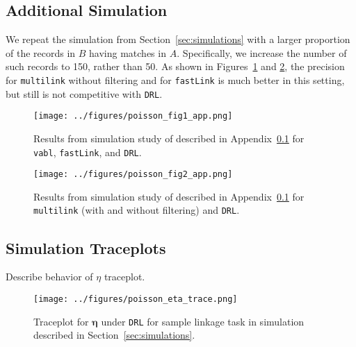 \documentclass[12pt,letterpaper]{article}
\newcommand{\1}[1]{\mathbb{I}\!\left[#1\right]} %
\begin{document}
\subsection{Additional Simulation}\label{app:simulation-2}

We repeat the simulation from Section~\ref{sec:simulations} with a larger proportion of the records in $B$ having matches in $A$. Specifically, we increase the number of such records to 150, rather than 50. As shown in Figures~\ref{fig:sim-vabl-comparison-2} and \ref{fig:sim-multilink-comparison-2}, the precision for \texttt{multilink} without filtering and for \texttt{fastLink} is much better in this setting, but still is not competitive with \texttt{DRL}. 

\begin{figure}[t]
	\centering
	\texttt{[image: ../figures/poisson\_fig1\_app.png]}
	\caption{Results from simulation study of described in Appendix~\ref{app:simulation-2} for \texttt{vabl}, \texttt{fastLink}, and \texttt{DRL}.}
	\label{fig:sim-vabl-comparison-2}
\end{figure}

\begin{figure}
	\centering
	\texttt{[image: ../figures/poisson\_fig2\_app.png]}
	\caption{Results from simulation study of described in Appendix~\ref{app:simulation-2} for \texttt{multilink} (with and without filtering) and \texttt{DRL}.}
	\label{fig:sim-multilink-comparison-2}
\end{figure}

\subsection{Simulation Traceplots}\label{app:simulation-traceplots}


Describe behavior of $\eta$ traceplot.
\begin{figure}[t]
	\centering
	\texttt{[image: ../figures/poisson\_eta\_trace.png]}
	\caption{Traceplot for $\bm{\eta}$ under \texttt{DRL} for sample linkage task in simulation described in Section~\ref{sec:simulations}.}
	\label{fig:eta-traceplot}
\end{figure}
\end{document}
